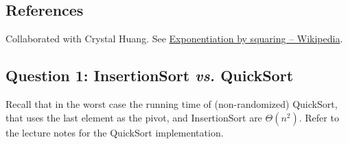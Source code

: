\def\lc{\left\lceil}   
\def\rc{\right\rceil}
\runningheadrule
\firstpageheadrule
\cfoot{}
\subsection*{References}
Collaborated with Crystal Huang. See \href{https://en.wikipedia.org/wiki/Exponentiation_by_squaring}{Exponentiation by squaring -- Wikipedia}.
\subsection*{Question 1: {\sc InsertionSort} \textit{vs.} {\sc QuickSort}}

Recall that in the worst case the running time of (non-randomized) {\sc QuickSort}, that uses the last element as the pivot, and {\sc InsertionSort} are $\Theta(n^2)$. Refer to the lecture notes for the {\sc QuickSort} implementation.

